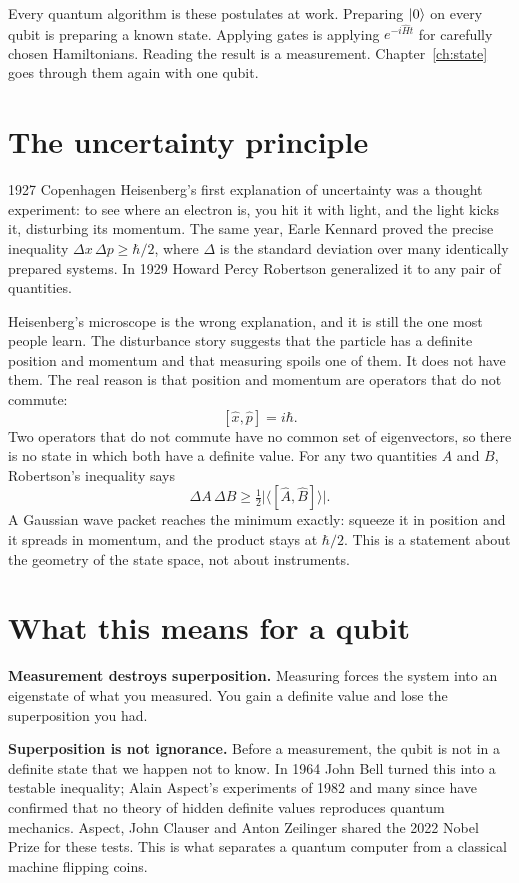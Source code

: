 Every quantum algorithm is these postulates at work. Preparing $\ket{0}$ on every
qubit is preparing a known state. Applying gates is applying
$e^{-i\hat Ht}$ for carefully chosen Hamiltonians. Reading the result is a
measurement. Chapter~\ref{ch:state} goes through them again with one qubit.

\section{The uncertainty principle}

\begin{history}{1927 \textperiodcentered{} Copenhagen}
Heisenberg's first explanation of uncertainty was a thought experiment: to see
where an electron is, you hit it with light, and the light kicks it, disturbing
its momentum. The same year, Earle Kennard proved the precise inequality
$\Delta x\,\Delta p \geq \hbar/2$, where $\Delta$ is the standard deviation over
many identically prepared systems. In 1929 Howard Percy Robertson generalized it to
any pair of quantities.
\end{history}

Heisenberg's microscope is the wrong explanation, and it is still the one most
people learn. The disturbance story suggests that the particle has a definite
position and momentum and that measuring spoils one of them. It does not have
them. The real reason is that position and momentum are operators that do not
commute:
\[
  [\hat x, \hat p] = i\hbar .
\]
Two operators that do not commute have no common set of eigenvectors, so there is
no state in which both have a definite value. For any two quantities $A$ and $B$,
Robertson's inequality says
\[
  \Delta A\,\Delta B \geq \tfrac12 \big|\langle [\hat A, \hat B] \rangle\big| .
\]
A Gaussian wave packet reaches the minimum exactly: squeeze it in position and it
spreads in momentum, and the product stays at $\hbar/2$. This is a statement
about the geometry of the state space, not about instruments.

\section{What this means for a qubit}

\textbf{Measurement destroys superposition.} Measuring forces the system into an
eigenstate of what you measured. You gain a definite value and lose the
superposition you had.

\textbf{Superposition is not ignorance.} Before a measurement, the qubit is not in
a definite state that we happen not to know. In 1964 John Bell turned this into a
testable inequality; Alain Aspect's experiments of 1982 and many since have
confirmed that no theory of hidden definite values reproduces quantum
mechanics. Aspect, John Clauser and Anton Zeilinger shared the 2022 Nobel Prize
for these tests. This is what separates a quantum computer from a classical
machine flipping coins.

